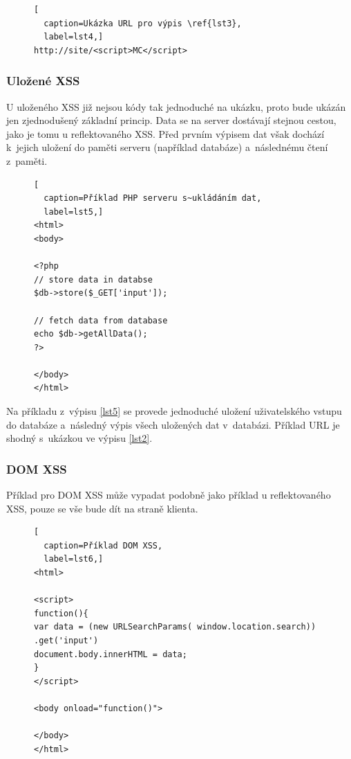 \documentclass[11pt, conference, a4paper]{IEEEtran}
\begin{document}
\begin{figure}[H]
\begin{lstlisting}[
  caption=Ukázka URL pro výpis \ref{lst3},
  label=lst4,]
http://site/<script>MC</script>
\end{lstlisting}
\end{figure}

\subsubsection{Uložené XSS}
U uloženého XSS již nejsou kódy tak jednoduché na ukázku, proto bude ukázán jen zjednodušený základní princip. Data se na server dostávají stejnou cestou, jako je tomu u reflektovaného XSS. Před prvním výpisem dat však dochází k~jejich uložení do paměti serveru (například databáze) a~následnému čtení z~paměti.

\begin{figure}[H]
\begin{lstlisting}[
  caption=Příklad PHP serveru s~ukládáním dat,
  label=lst5,]
<html>
<body>

<?php
// store data in databse
$db->store($_GET['input']);

// fetch data from database
echo $db->getAllData();
?>

</body>
</html>
\end{lstlisting}
\end{figure}

Na příkladu z~výpisu \ref{lst5} se provede jednoduché uložení uživatelského vstupu do databáze a~následný výpis všech uložených dat v~databázi. Příklad URL je shodný s~ukázkou ve výpisu \ref{lst2}.

\subsubsection{DOM XSS}
Příklad pro DOM XSS může vypadat podobně jako příklad u reflektovaného XSS, pouze se vše bude dít na straně klienta. 

\begin{figure}[H]
\begin{lstlisting}[
  caption=Příklad DOM XSS,
  label=lst6,]
<html>

<script>
function(){
var data = (new URLSearchParams( window.location.search)) .get('input')
document.body.innerHTML = data;
}
</script>

<body onload="function()">

</body>
</html>
\end{lstlisting}
\end{figure}
\end{document}
